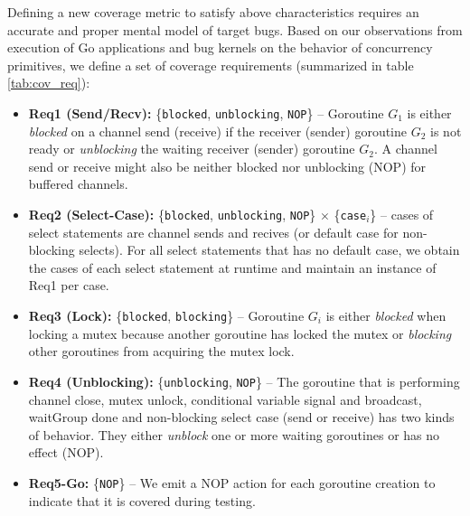 Defining a new coverage metric to satisfy above characteristics requires an accurate and proper mental model of target bugs.
%
Based on our observations from execution of Go applications and bug kernels on the behavior of concurrency primitives, we define a set of coverage requirements (summarized in table \ref{tab:cov_req}):
%
\begin{itemize}
  \item \textbf{Req1 (Send/Recv):} \{\texttt{blocked}, \texttt{unblocking}, \texttt{NOP}\} -- Goroutine $G_1$ is either \textit{blocked} on a channel send (receive) if the receiver (sender) goroutine $G_2$ is not ready or \textit{unblocking} the waiting receiver (sender) goroutine $G_2$. A channel send or receive might also be neither blocked nor unblocking (NOP) for buffered channels.
  \item \textbf{Req2 (Select-Case):} \{\texttt{blocked}, \texttt{unblocking}, \texttt{NOP}\} $\times$ \{\texttt{case}$_i$\} -- cases of select statements are channel sends and recives (or default case for non-blocking selects). For all select statements that has no default case, we obtain the cases of each select statement at runtime and maintain an instance of Req1 per case.
  \item \textbf{Req3 (Lock):} \{\texttt{blocked}, \texttt{blocking}\} -- Goroutine $G_i$ is either \textit{blocked} when locking a mutex because another goroutine has locked the mutex or \textit{blocking} other goroutines from acquiring the mutex lock.
  \item \textbf{Req4 (Unblocking):} \{\texttt{unblocking}, \texttt{NOP}\} -- The goroutine that is performing channel close, mutex unlock, conditional variable signal and broadcast, waitGroup done and non-blocking select case (send or receive) has two kinds of behavior. They either \textit{unblock} one or more waiting goroutines or has no effect (NOP).
  \item \textbf{Req5-Go:} \{\texttt{NOP}\} -- We emit a NOP action for each goroutine creation to indicate that it is covered during testing.
\end{itemize}


